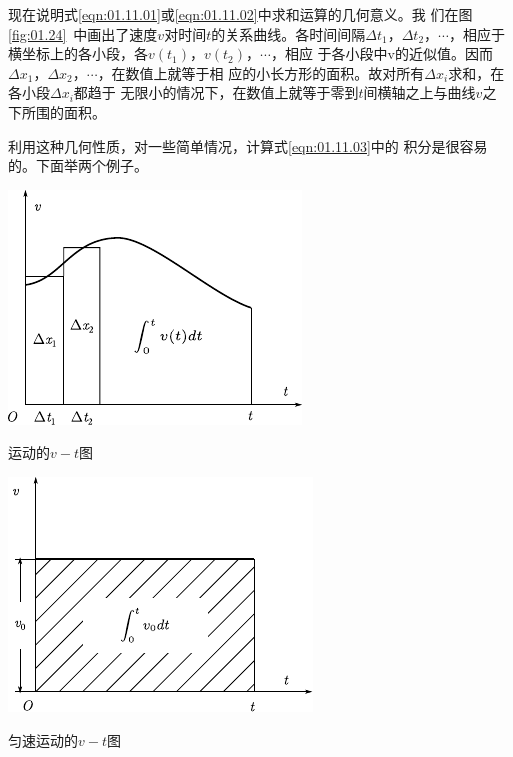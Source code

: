 现在说明式\eqref{eqn:01.11.01}或\eqref{eqn:01.11.02}中求和运算的几何意义。我
们在图\ref{fig:01.24}~中画出了速度$v$对时间$t$的关系曲线。各时间间隔$\Delta t_1$，$\Delta t_2$，$\cdots$，相应于横坐标上的各小段，各$v\left(t_1\right)$，$v\left(t_2\right)$，$\cdots$，相应
于各小段中v的近似值。因而$\Delta x_1$，$\Delta x_2$，$\cdots$，在数值上就等于相
应的小长方形的面积。故对所有$\Delta x_i$求和，在各小段$\Delta x_i$都趋于
无限小的情况下，在数值上就等于零到$t$间横轴之上与曲线$v$之
下所围的面积。

    利用这种几何性质，对一些简单情况，计算式\eqref{eqn:01.11.03}中的
积分是很容易的。下面举两个例子。
\begin{figurex}[!h]
    \begin{minipage}[b]{14em}
        \centering
        \includegraphics[width=0.8\linewidth]{figure/fig01.24}
        \caption{运动的$v-t$图}
        \label{fig:01.24}
    \end{minipage}\hfill
    \begin{minipage}[b]{14em}
        \centering
        \includegraphics[width=0.8\linewidth]{figure/fig01.25}
        \caption{匀速运动的$v-t$图}
        \label{fig:01.25}
    \end{minipage}
\end{figurex}

